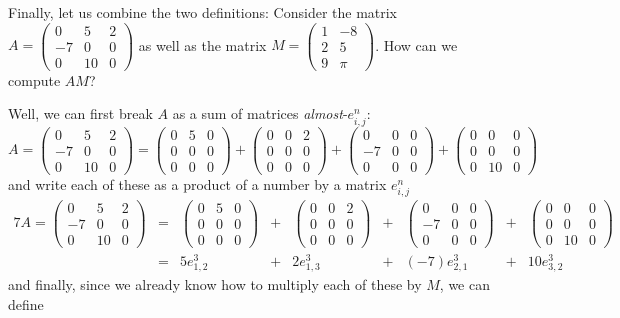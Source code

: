 \bigskip
Finally, let us combine the two definitions: Consider the matrix $A=\begin{pmatrix}
0 & 5 & 2\\
-7 & 0 & 0\\
0 & 10 & 0
\end{pmatrix}$ as well as the matrix $M=\begin{pmatrix}
1 & -8\\
2 & 5\\
9 & \pi
\end{pmatrix}$. How can we compute $AM$?

Well, we can first break $A$ as a sum of matrices \textit{almost}-$e^n_{i,j}$:
\[A=\begin{pmatrix}
0 & 5 & 2\\
-7 & 0 & 0\\
0 & 10 & 0
\end{pmatrix}=\begin{pmatrix}
0 & 5 & 0\\
0&0&0\\
0&0&0
\end{pmatrix}+ \begin{pmatrix}
0 & 0 & 2 \\
0 & 0 & 0 \\
0 & 0 & 0 
\end{pmatrix}  + \begin{pmatrix}
0 & 0 & 0 \\
-7 & 0 & 0 \\
0 & 0 & 0 
\end{pmatrix}  + \begin{pmatrix}
0 & 0 & 0 \\
0 & 0 & 0 \\
0 & 10 & 0 
\end{pmatrix}\]and write each of these as a product of a number by a matrix $e^n_{i,j}$
\begin{alignat*}{7}
A=\begin{pmatrix}
0 & 5 & 2\\
-7 & 0 & 0\\
0 & 10 & 0
\end{pmatrix}&=&\begin{pmatrix}
0 & 5 & 0\\
0&0&0\\
0&0&0
\end{pmatrix}&+&\begin{pmatrix}
0 & 0 & 2 \\
0 & 0 & 0 \\
0 & 0 & 0 
\end{pmatrix}&+&\begin{pmatrix}
0 & 0 & 0 \\
-7 & 0 & 0 \\
0 & 0 & 0 
\end{pmatrix}&+&\begin{pmatrix}
0 & 0 & 0 \\
0 & 0 & 0 \\
0 & 10 & 0 
\end{pmatrix}\\&=&5e^3_{1,2} \quad\ &+&2e^3_{1,3}\quad&+&(-7)e^3_{2,1}\quad&+&10e^3_{3,2}\quad
\end{alignat*}and finally, since we already know how to multiply each of these by $M$, we can define
